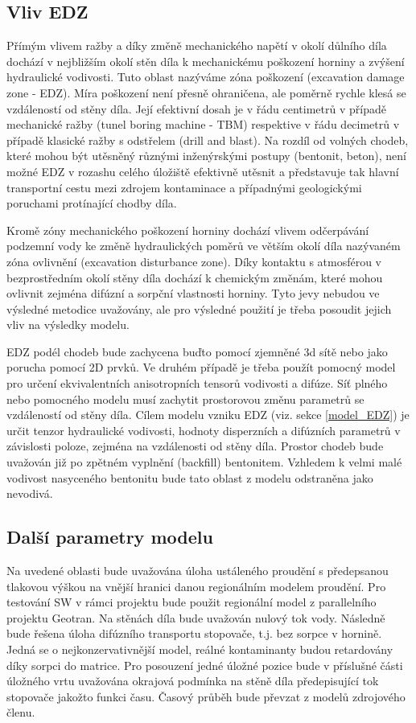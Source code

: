 \documentclass{article}
\begin{document}


\subsection{Vliv EDZ}
Přímým vlivem ražby a díky změně mechanického napětí v  okolí důlního díla dochází v nejbližším okolí stěn díla k mechanickému poškození horniny a zvýšení hydraulické vodivosti. Tuto oblast nazýváme zóna poškození (excavation damage zone - EDZ). Míra poškození není přesně ohraničena, ale poměrně rychle klesá se vzdáleností od stěny díla. Její efektivní dosah je v řádu centimetrů v případě mechanické ražby (tunel boring machine - TBM) respektive v řádu decimetrů v případě klasické ražby s odstřelem (drill and blast). Na rozdíl od volných chodeb, které mohou být utěsněný různými inženýrskými postupy (bentonit, beton), není možné EDZ v rozashu celého úložiště efektivně utěsnit a představuje tak hlavní transportní cestu mezi zdrojem kontaminace a případnými geologickými poruchami protínající chodby díla.

Kromě zóny mechanického poškození horniny dochází vlivem odčerpávání podzemní vody ke změně hydraulických poměrů ve větším okolí díla nazývaném zóna ovlivnění (excavation disturbance zone). Díky kontaktu s atmosférou v bezprostředním okolí stěny díla dochází k chemickým změnám, které mohou ovlivnit zejména difúzní a sorpční vlastnosti horniny. Tyto jevy nebudou ve výsledné metodice uvažovány, ale pro výsledné použití je třeba posoudit jejich vliv na výsledky modelu.

EDZ podél chodeb bude zachycena buďto pomocí zjemněné 3d sítě nebo jako porucha pomocí 2D prvků. Ve druhém případě je třeba použít pomocný model pro určení ekvivalentních anisotropních tensorů vodivosti a difúze. Síť plného nebo pomocného modelu musí zachytit prostorovou změnu parametrů 
se vzdáleností od stěny díla. Cílem modelu vzniku EDZ (viz. sekce \ref{model_EDZ}) je určit tenzor hydraulické vodivosti, hodnoty disperzních a difúzních parametrů v závislosti poloze, zejména na vzdálenosti od stěny díla.
Prostor chodeb bude uvažován již po zpětném vyplnění (backfill) bentonitem. Vzhledem k velmi malé vodivost nasyceného bentonitu  bude tato oblast z modelu odstraněna jako nevodivá.

\subsection{Další parametry modelu}
Na uvedené oblasti bude uvažována úloha ustáleného proudění s předepsanou tlakovou výškou na vnější hranici danou regionálním modelem proudění. Pro testování SW v rámci projektu bude použit regionální model z parallelního projektu Geotran. Na stěnách díla bude uvažován nulový tok vody. 
Následně bude řešena úloha difúzního transportu stopovače, t.j. bez sorpce v hornině. Jedná se o nejkonzervativnější model, reálné kontaminanty budou retardovány díky sorpci do matrice. Pro posouzení jedné úložné pozice bude v příslušné části úložného vrtu uvažována okrajová podmínka na stěně díla předepisující tok stopovače jakožto funkci času. Časový průběh bude převzat z modelů zdrojového členu.
\end{document}
